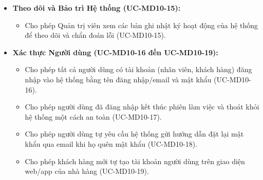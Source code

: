 \begin{itemize}
    \item \textbf{Theo dõi và Bảo trì Hệ thống (UC-MD10-15):}
    \begin{itemize}
        \item Cho phép Quản trị viên xem các bản ghi nhật ký hoạt động của hệ thống để theo dõi và chẩn đoán lỗi (UC-MD10-15).
    \end{itemize}

    \item \textbf{Xác thực Người dùng (UC-MD10-16 đến UC-MD10-19):}
    \begin{itemize}
        \item Cho phép tất cả người dùng có tài khoản (nhân viên, khách hàng) đăng nhập vào hệ thống bằng tên đăng nhập/email và mật khẩu (UC-MD10-16).
        \item Cho phép người dùng đã đăng nhập kết thúc phiên làm việc và thoát khỏi hệ thống một cách an toàn (UC-MD10-17).
        \item Cho phép người dùng tự yêu cầu hệ thống gửi hướng dẫn đặt lại mật khẩu qua email khi họ quên mật khẩu (UC-MD10-18).
        \item Cho phép khách hàng mới tự tạo tài khoản người dùng trên giao diện web/app của nhà hàng (UC-MD10-19).
    \end{itemize}
\end{itemize}

